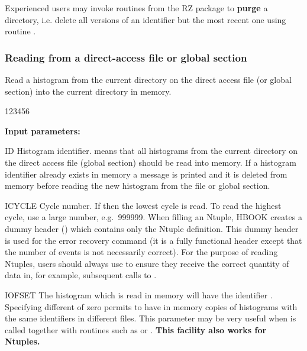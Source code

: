 Experienced users may invoke routines
from the \ZEBRA{} RZ package to {\bf purge}
a directory, i.e.
delete all versions of an identifier but the most recent one
using routine .

 
\subsubsection*{\label{HREADDAF}Reading from a direct-access file or global section}
 
 
\Action
Read a histogram from the
current directory on the direct access file (or global section)
into the current directory in memory.

\begin{DLtt}{123456}
\item[{\rm\bf Input parameters:}]
\item[ID]
Histogram identifier.
 means that all histograms from the current directory on
the direct access file (global section) should be read into memory.
If a histogram identifier  already exists in
memory
a message is printed and it is deleted from memory before reading
the new histogram from the file or global section.
\item[ICYCLE]
Cycle number. If  then the lowest cycle is read.\break
To read the highest cycle, use a large number, e.g.\ 999999.
When filling an Ntuple, HBOOK creates a dummy header () 
which contains only the Ntuple definition.
This dummy header is used for the error recovery command 
(it is a fully functional header except that the number 
of events is not necessarily correct).
For the purpose of reading Ntuples, users should always use 
to ensure they receive the correct quantity of data in, for example,
subsequent calls to .
\item[IOFSET]
The histogram which is read in memory will have the identifier
.
Specifying  different of zero permits to have in memory
copies of histograms with the same identifiers 
in different files. This parameter may be very useful when 
is called together with routines such as  or .
\textbf{This facility also works for Ntuples.}
\end{DLtt}
 
